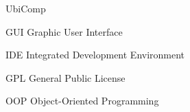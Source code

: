 \documentclass[tg]{mdtufsm}
\begin{document}


\begin{listofabbrv}{UbiComp}
    \item [GUI] Graphic User Interface
    \item [IDE] Integrated Development Environment
    \item [GPL] General Public License
    \item [OOP] Object-Oriented Programming
\end{listofabbrv}



\tableofcontents


\setlength{\baselineskip}{1.5\baselineskip}








\end{document}
